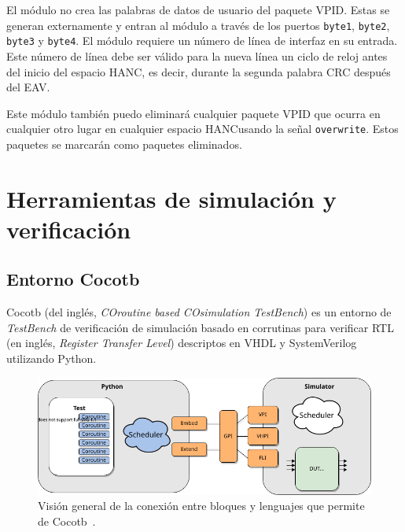 El módulo no crea las palabras de datos de usuario del paquete VPID\@. Estas se
generan externamente y entran al módulo a través de los puertos \texttt{byte1},
\texttt{byte2}, \texttt{byte3} y \texttt{byte4}. El módulo requiere un número
de línea de interfaz en su entrada. Este número de línea debe ser válido para
la nueva línea un ciclo de reloj antes del inicio del espacio HANC, es decir,
durante la segunda palabra CRC después del EAV\@.

Este módulo también puedo eliminará cualquier paquete VPID que ocurra en
cualquier otro lugar en cualquier espacio HANC\@ usando la señal
\texttt{overwrite}. Estos paquetes se marcarán como paquetes eliminados. 




\section{Herramientas de simulación y verificación}

\subsection{Entorno Cocotb}

  Cocotb (del inglés, \textit{COroutine based COsimulation
  TestBench}) es un entorno de \textit{TestBench} de verificación de simulación
  basado en corrutinas para verificar RTL (en inglés,
  \textit{Register Transfer Level}) descriptos en VHDL y SystemVerilog utilizando
  Python.

  \begin{figure}[h]
    \centering
    \includegraphics[width=\textwidth]{./Figures/cocotb_overview.png}
    \caption{Visión general de la conexión entre bloques y lenguajes que permite de Cocotb~\citep{cocotb}.}
  \end{figure}
  
